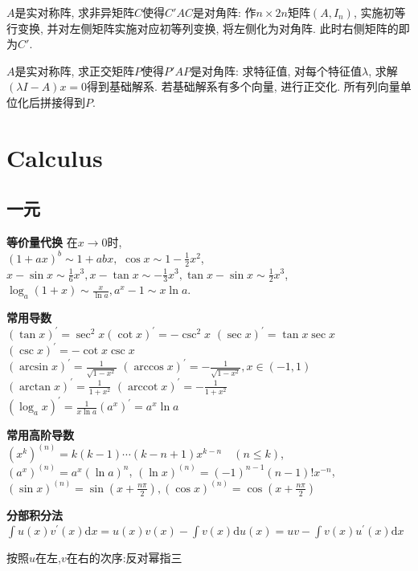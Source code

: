 \documentclass[UTF8]{ctexart}
\begin{document}
$A$是实对称阵, 求非异矩阵$C$使得$C'AC$是对角阵:
作$n\times 2n$矩阵$(A, I_n)$, 实施初等行变换, 并对左侧矩阵实施对应初等列变换,
将左侧化为对角阵. 此时右侧矩阵的即为$C'$.

$A$是实对称阵, 求正交矩阵$P$使得$P'AP$是对角阵:
求特征值, 对每个特征值$\lambda$, 求解$(\lambda I-A)x=0$得到基础解系.
若基础解系有多个向量, 进行正交化.
所有列向量单位化后拼接得到$P$.

\section{Calculus}

\subsection{一元}

\noindent \textbf{等价量代换}  \quad 在$x\to0$时, \\
$(1+ax)^b\sim 1+abx,$
$\cos x\sim 1-\frac{1}{2}x^2$, 
$x-\sin x\sim \frac{1}{6}x^3,x-\tan x\sim -\frac{1}{3}x^3,
\tan x-\sin x\sim \frac{1}{2}x^3$, \\
$\log_a(1+x)\sim \frac{x}{\ln a},a^x-1\sim x\ln a$.


\noindent \textbf{常用导数}\\
$(\tan x)^{\prime}=\sec ^{2} x $\qquad $ (\cot x)^{\prime}=-\csc ^{2} x $\qquad
$(\sec x)^{\prime}=\tan x \sec x $\qquad $ (\csc x)^{\prime}=-\cot x \csc x $\\
$(\arcsin x)^{\prime}=\frac{1}{\sqrt{1-x^{2}}}$
\qquad $(\arccos x)^{\prime}=-\frac{1}{\sqrt{1-x^{2}}}, x \in(-1,1) $\\
$(\arctan x)^{\prime}=\frac{1}{1+x^{2}} $
\qquad $(\operatorname{arccot} x)^{\prime}=-\frac{1}{1+x^{2}} $\\ 
$\left(\log _{a} x\right)^{\prime}=\frac{1}{x \ln a}$\qquad $\left(a^{x}\right)^{\prime}=a^{x} \ln a$


\noindent \textbf{常用高阶导数}\\
$\left(x^{k}\right)^{(n)}=k(k-1) \cdots(k-n+1) x^{k-n} \quad(n \leq k)$,\\
$\left(a^{x}\right)^{(n)}=a^{x}(\ln a)^{n}$,
$(\ln x)^{(n)}=(-1)^{n-1}(n-1) ! x^{-n}$, \\
$(\sin x)^{(n)}=\sin \left(x+\frac{n \pi}{2}\right),
(\cos x)^{(n)}=\cos \left(x+\frac{n \pi}{2}\right)$


\noindent \textbf{分部积分法}
$\int u(x) v^{\prime}(x) \mathrm{d} x= u(x) v(x)-\int v(x) \mathrm{d} u(x) =u v-\int v(x) u^{\prime}(x) \mathrm{d} x$
\par 按照$u$在左,$v$在右的次序:反对幂指三
\end{document}
